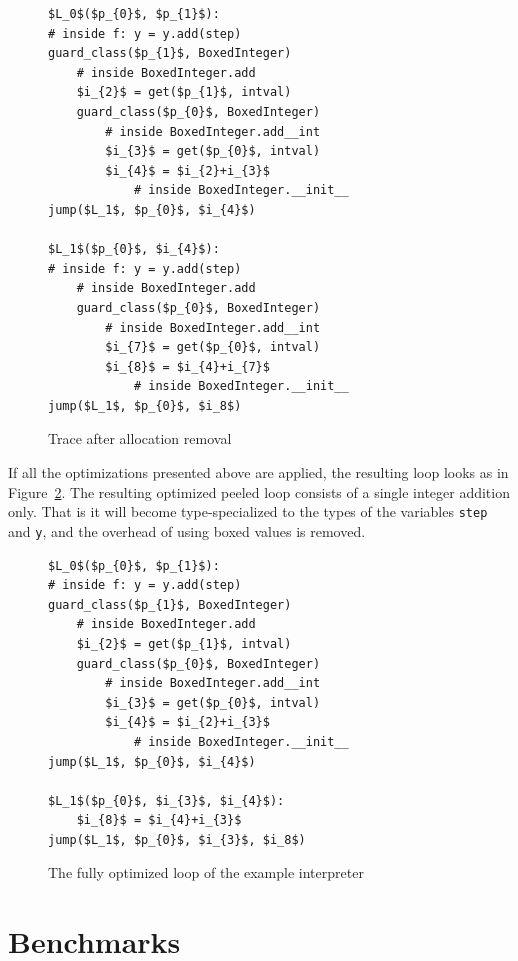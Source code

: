 \documentclass[preprint]{sigplanconf}
\begin{document}
\begin{figure}
\begin{lstlisting}[mathescape,numbers = right,basicstyle=\setstretch{1.05}\ttfamily\scriptsize]
$L_0$($p_{0}$, $p_{1}$):
# inside f: y = y.add(step)
guard_class($p_{1}$, BoxedInteger)
    # inside BoxedInteger.add
    $i_{2}$ = get($p_{1}$, intval)
    guard_class($p_{0}$, BoxedInteger)
        # inside BoxedInteger.add__int
        $i_{3}$ = get($p_{0}$, intval)
        $i_{4}$ = $i_{2}+i_{3}$
            # inside BoxedInteger.__init__
jump($L_1$, $p_{0}$, $i_{4}$)

$L_1$($p_{0}$, $i_{4}$):
# inside f: y = y.add(step)
    # inside BoxedInteger.add
    guard_class($p_{0}$, BoxedInteger)
        # inside BoxedInteger.add__int
        $i_{7}$ = get($p_{0}$, intval)
        $i_{8}$ = $i_{4}+i_{7}$
            # inside BoxedInteger.__init__
jump($L_1$, $p_{0}$, $i_8$)
\end{lstlisting}
\caption{Trace after allocation removal}
\label{fig:virtual-trace}
\end{figure}

If all the optimizations presented above are applied, the resulting loop looks
as in Figure~\ref{fig:opt-trace}.
The resulting optimized peeled loop consists of a single integer addition
only. That is it will become type-specialized to the types of the
variables \lstinline{step} and \lstinline{y}, and the overhead of
using boxed values is removed.


\begin{figure}
\begin{lstlisting}[mathescape,numbers = right,basicstyle=\setstretch{1.05}\ttfamily\scriptsize]
$L_0$($p_{0}$, $p_{1}$):
# inside f: y = y.add(step)
guard_class($p_{1}$, BoxedInteger)
    # inside BoxedInteger.add
    $i_{2}$ = get($p_{1}$, intval)
    guard_class($p_{0}$, BoxedInteger)
        # inside BoxedInteger.add__int
        $i_{3}$ = get($p_{0}$, intval)
        $i_{4}$ = $i_{2}+i_{3}$
            # inside BoxedInteger.__init__
jump($L_1$, $p_{0}$, $i_{4}$)

$L_1$($p_{0}$, $i_{3}$, $i_{4}$):
    $i_{8}$ = $i_{4}+i_{3}$
jump($L_1$, $p_{0}$, $i_{3}$, $i_8$)
\end{lstlisting}
\caption{The fully optimized loop of the example interpreter}
\label{fig:opt-trace}
\end{figure}


\section{Benchmarks}
\label{sec:benchmarks}
\end{document}
